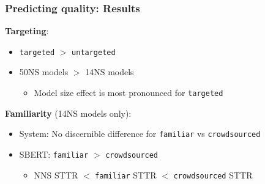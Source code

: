 \documentclass[handout,xcolor={dvipsnames}]{beamer}
\newcommand{\param}[1]{\texttt{#1}}
\begin{document}
\begin{frame}
\frametitle{Predicting quality: Results}

\vspace{-.5em}

\pause
\textbf{Targeting}:
\begin{itemize}
\pause
\item \param{targeted} $>$ \param{untargeted}
\pause
\item 50NS models $>$ 14NS models
\begin{itemize}
\pause
\item Model size effect is most pronounced for \param{targeted}
\end{itemize}
\end{itemize}

\vspace{1em}

\pause
\textbf{Familiarity} (14NS models only):
\begin{itemize}
\pause
\item System: No discernible difference for \param{familiar} vs \param{crowdsourced}
\pause
\item SBERT: \param{familiar} $>$ \param{crowdsourced}
\begin{itemize}
\pause
\item NNS STTR $<$ \param{familiar} STTR $<$ \param{crowdsourced} STTR
\end{itemize}
\end{itemize}

\end{frame}
\end{document}
